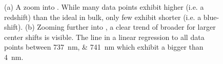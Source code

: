 		\begin{figure}[htp]
			\begin{subfigure}{.5\textwidth}
				\centering
				\caption{}
				\label{subfig::distro_inset1}
			\end{subfigure}
			\begin{subfigure}{.5\textwidth}
				\centering
				\caption{}
				\label{subfig::distro_inset2}
			\end{subfigure}
			\caption[Zoom-in onto \sivs of the \vl]{(a) A zoom into \vl. While many data points exhibit higher \cwls (i.e. a redshift) than the ideal \siv in bulk, only few exhibit shorter \cwls (i.e. a blue-shift). (b) Zooming further into \vl, a clear trend of broader \ZPL \lws for larger \ZPL center shifts is visible. The line in a linear regression to all data points between \SIlist{737;741}{\nano\meter} which exhibit a \lw bigger than \SI{4}{\nano\meter}.}
			\label{fig::bimodal_distr_zoom}
		\end{figure}

